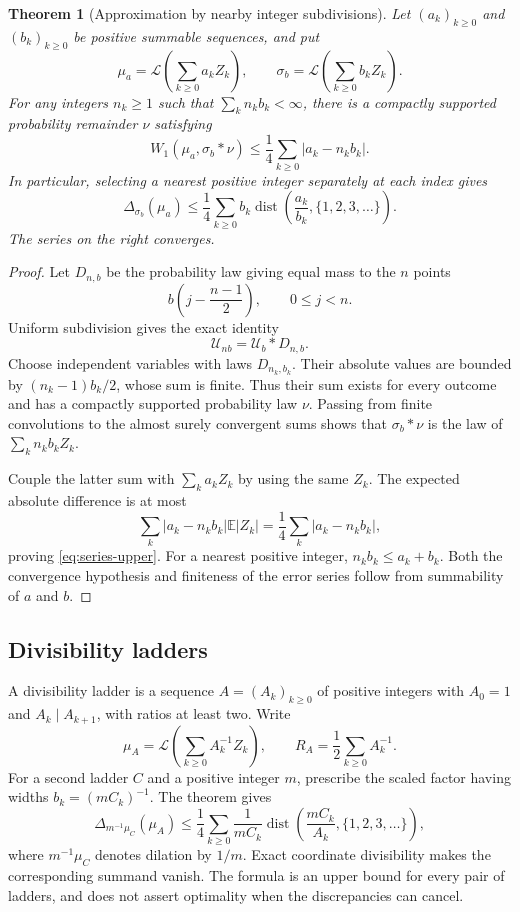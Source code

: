 \documentclass[11pt,letterpaper]{article}
\newtheorem{theorem}{Theorem}[section]
\theoremstyle{definition}
\theoremstyle{remark}
\newcommand{\E}{\mathbb E}
\newcommand{\Un}{\mathcal U}
\newcommand{\Law}{\mathcal L}
\newcommand{\dist}{\operatorname{dist}}
\begin{document}
\begin{theorem}[Approximation by nearby integer subdivisions]\label{thm:subdivision-upper}
Let $(a_k)_{k\ge0}$ and $(b_k)_{k\ge0}$ be positive summable sequences, and put
\[
 \mu_a=\Law\left(\sum_{k\ge0}a_kZ_k\right),\qquad
 \sigma_b=\Law\left(\sum_{k\ge0}b_kZ_k\right).
\]
For any integers $n_k\ge1$ such that $\sum_k n_kb_k<\infty$, there is a compactly supported probability remainder $\nu$ satisfying
\begin{equation}\label{eq:series-upper}
 W_1(\mu_a,\sigma_b*\nu)
 \le\frac14\sum_{k\ge0}|a_k-n_kb_k|.
\end{equation}
In particular, selecting a nearest positive integer separately at each index gives
\begin{equation}\label{eq:nearest-upper}
 \Delta_{\sigma_b}(\mu_a)
 \le\frac14\sum_{k\ge0}b_k\dist\left(\frac{a_k}{b_k},\{1,2,3,\ldots\}\right).
\end{equation}
The series on the right converges.
\end{theorem}
\begin{proof}
Let $D_{n,b}$ be the probability law giving equal mass to the $n$ points
\[
 b\left(j-\frac{n-1}{2}\right),\qquad 0\le j<n.
\]
Uniform subdivision gives the exact identity
\[
 \Un_{nb}=\Un_b*D_{n,b}.
\]
Choose independent variables with laws $D_{n_k,b_k}$. Their absolute values are bounded by $(n_k-1)b_k/2$, whose sum is finite. Thus their sum exists for every outcome and has a compactly supported probability law $\nu$. Passing from finite convolutions to the almost surely convergent sums shows that $\sigma_b*\nu$ is the law of $\sum_k n_kb_kZ_k$.

Couple the latter sum with $\sum_k a_kZ_k$ by using the same $Z_k$. The expected absolute difference is at most
\[
 \sum_k|a_k-n_kb_k|\E|Z_k|
 =\frac14\sum_k|a_k-n_kb_k|,
\]
proving \eqref{eq:series-upper}. For a nearest positive integer, $n_kb_k\le a_k+b_k$. Both the convergence hypothesis and finiteness of the error series follow from summability of $a$ and $b$.
\end{proof}

\subsection{Divisibility ladders}
A divisibility ladder is a sequence $A=(A_k)_{k\ge0}$ of positive integers with $A_0=1$ and $A_k\mid A_{k+1}$, with ratios at least two. Write
\[
 \mu_A=\Law\left(\sum_{k\ge0}A_k^{-1}Z_k\right),
 \qquad R_A=\frac12\sum_{k\ge0}A_k^{-1}.
\]
For a second ladder $C$ and a positive integer $m$, prescribe the scaled factor having widths $b_k=(mC_k)^{-1}$. The theorem gives
\begin{equation}\label{eq:ladder-upper}
 \Delta_{m^{-1}\mu_C}(\mu_A)
 \le\frac14\sum_{k\ge0}\frac1{mC_k}
 \dist\left(\frac{mC_k}{A_k},\{1,2,3,\ldots\}\right),
\end{equation}
where $m^{-1}\mu_C$ denotes dilation by $1/m$. Exact coordinate divisibility makes the corresponding summand vanish. The formula is an upper bound for every pair of ladders, and does not assert optimality when the discrepancies can cancel.
\end{document}
